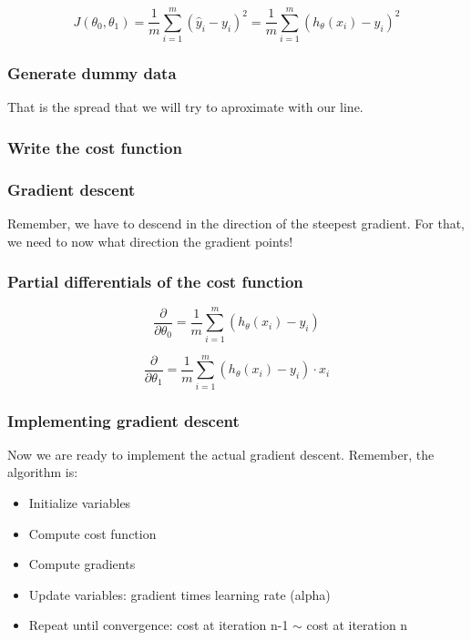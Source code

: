 \documentclass[11pt]{article}
\begin{document}
\[J(\theta_0,\theta_1) = \frac{1}{m}\sum_{i=1}^m(\hat{y}_i-y_i)^2 = \frac{1}{m}\sum_{i=1}^m(h_\theta(x_i)-y_i)^2 \]

    \subsubsection{Generate dummy data}\label{generate-dummy-data}

    That is the spread that we will try to aproximate with our line.

    \subsubsection{Write the cost function}\label{write-the-cost-function}

    \subsubsection{Gradient descent}\label{gradient-descent}

    Remember, we have to descend in the direction of the steepest gradient.
For that, we need to now what direction the gradient points!

    \subsubsection{Partial differentials of the cost
function}\label{partial-differentials-of-the-cost-function}

\[\frac{\partial}{\partial\theta_0} = \frac{1}{m}\sum_{i=1}^m(h_\theta(x_i)-y_i)\]

\[\frac{\partial}{\partial\theta_1} = \frac{1}{m}\sum_{i=1}^m(h_\theta(x_i)-y_i) \cdot x_i\]

    \subsubsection{Implementing gradient
descent}\label{implementing-gradient-descent}

Now we are ready to implement the actual gradient descent. Remember, the
algorithm is:

\begin{itemize}
\item
  Initialize variables
\item
  Compute cost function
\item
  Compute gradients
\item
  Update variables: gradient times learning rate (alpha)
\item
  Repeat until convergence: cost at iteration n-1 \(\sim\) cost at
  iteration n
\end{itemize}
\end{document}
